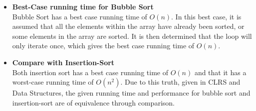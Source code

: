 \documentclass[12pt]{article}
\begin{document}
\begin{itemize}
\begin{itemize}
        \linebreak
        \item \textbf{Best-Case running time for Bubble Sort} \\
        \linebreak
        Bubble Sort has a best case running time of $O(n)$. In this best case, it is assumed that all the elements within the array have already been sorted, or some elements in the array are sorted. It is then determined that the loop will only iterate once,  which gives the best case running time of $O(n).$
        \linebreak
        \item \textbf{Compare with Insertion-Sort} \\
        \linebreak
 Both insertion sort has a best case running time of $O(n)$ and that it has a worst-case running time of $O(n^2)$.  Due to this truth, given in CLRS and Data Structures, the given running time and performance for bubble sort and insertion-sort are of equivalence through comparison.
    \end{itemize}
\end{itemize}
\end{document}
